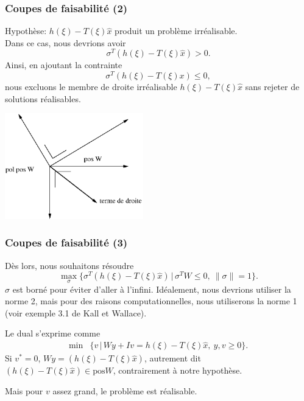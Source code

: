 \begin{frame}
	\frametitle{Coupes de faisabilité (2)}
	
	{\red Hypothèse:} $h(\xi) - T(\xi)\hat{x}$ produit un problème
	irréalisable.\\
	Dans ce cas, nous devrions avoir
	\[
	\sigma^T(h(\xi) - T(\xi)\hat{x}) > 0.
	\]
	Ainsi, en ajoutant la contrainte
	\[
	\sigma^T(h(\xi) - T(\xi) x) \leq 0,
	\]
	nous excluons le membre de droite irréalisable $h(\xi) -
	T(\xi)\hat{x}$ sans rejeter de solutions réalisables.
	
	\begin{center}
		\includegraphics[width=0.45\textwidth]{cones_2.eps}
	\end{center}
	
\end{frame}

\begin{frame}
	\frametitle{Coupes de faisabilité (3)}
	
	Dès lors, nous souhaitons résoudre
	\[
	\max_{\sigma} \lbrace \sigma^T(h(\xi) - T(\xi)\hat{x}) \,|\, \sigma^TW
	\leq 0,\ \|\sigma\| = 1 \rbrace.
	\]
	$\sigma$ est borné pour éviter d'aller à l'infini. Idéalement,
	nous devrions utiliser la norme 2, mais pour des raisons
	computationnelles, nous utiliserons la norme 1 (voir exemple 3.1 de
	Kall et Wallace).
	
	\mbox{}
	
	
	Le dual s'exprime comme
	\begin{align*}
		\min & \lbrace v \,|\, Wy + Iv = h(\xi) - T(\xi)\hat{x},\ y, v \geq 0 \rbrace.
	\end{align*}
	Si $v^* = 0$, $Wy = (h(\xi) - T(\xi)\hat{x})$, autrement dit $(h(\xi) -
	T(\xi)\hat{x}) \in \mbox{pos}W$, contrairement à notre hypothèse.
	
	Mais pour $v$ assez grand, le problème est réalisable.
	
\end{frame}

